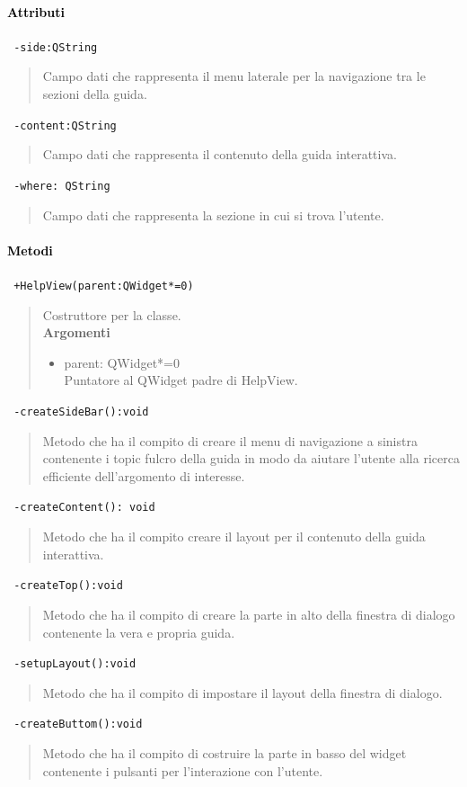 \paragraph{\textcolor{black}{Attributi\\}}
\color{teal}\verb! -side:QString!
\color{black} 
\begin{quote}Campo dati che rappresenta il menu laterale per la navigazione tra le sezioni della guida.
\end{quote}
\color{teal}\verb! -content:QString!
\color{black} 
\begin{quote}Campo dati che rappresenta il contenuto della guida interattiva.
\end{quote}
\color{teal}\verb! -where: QString!
\color{black}
\begin{quote}Campo dati che rappresenta la sezione in cui si trova l'utente.
\end{quote}
\paragraph{\textcolor{black}{Metodi\\}}
\color{blue}\verb! +HelpView(parent:QWidget*=0)!
\begin{quote}
\color{black}Costruttore per la classe. \\
\textbf{Argomenti}
\begin{itemize}
\item parent: QWidget*=0  \\ Puntatore al QWidget padre di HelpView.
\end{itemize}
\end{quote}
\color{blue}\verb! -createSideBar():void!
\begin{quote}
\color{black} Metodo che ha il compito di creare il menu di navigazione a sinistra contenente i topic fulcro della guida in modo da aiutare l'utente alla ricerca efficiente dell'argomento di interesse.
\end{quote} 
\color{blue}\verb! -createContent(): void !
\begin{quote}
\color{black} Metodo che ha il compito creare il layout per il contenuto della guida interattiva.
\end{quote} 
\color{blue}\verb! -createTop():void!
\begin{quote}
\color{black} Metodo che ha il compito di creare la parte in alto della finestra di dialogo contenente la vera e propria guida.
\end{quote} 
\color{blue}\verb! -setupLayout():void!
\begin{quote}
\color{black} Metodo che ha il compito di impostare il layout della finestra di dialogo.
\end{quote} 
\color{blue}\verb! -createButtom():void!
\color{black}
\begin{quote}
 Metodo che ha il compito di costruire la parte in basso del widget contenente i pulsanti per l'interazione con l'utente.
\end{quote}
\color{black}
\pagebreak


